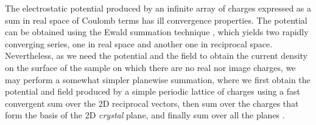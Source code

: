 \documentclass{article}
\begin{document}
The electrostatic potential produced by an infinite array of
charges expressed as a sum in real space of Coulomb terms has ill
convergence properties. The potential can be obtained
using the Ewald summation technique \cite{T3,T4,T5}, which yields
two rapidly converging series, one in real space and another one in reciprocal space.
Nevertheless, as we need the potential and the field to obtain the
current density on the surface of the sample on which there are no
real nor image charges, we may perform a somewhat simpler planewise
summation, where we first obtain the potential and field produced by a
simple periodic lattice of charges using a fast convergent sum over the 2D
reciprocal vectors, then sum over the charges that form the basis
of the 2D {\em crystal} plane, and finally sum over all the
 planes \cite{T6,T7}.
\end{document}
